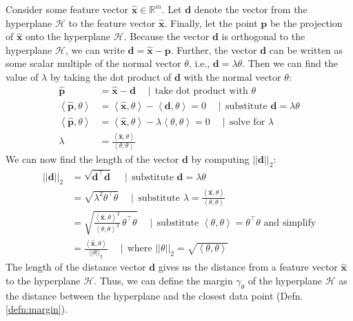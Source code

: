 \documentclass{article}[11pt]
\def\R{\mathbb{R}}
\newcommand{\norm}[1]{\left|\left|#1\right|\right|}
\begin{document}
Consider some feature vector $\hat{\mathbf{x}} \in \R^{m}$. Let $\mathbf{d}$ denote the vector from the hyperplane $\mathcal{H}$ to the feature vector $\hat{\mathbf{x}}$.
Finally, let the point $\mathbf{p}$ be the projection of $\hat{\mathbf{x}}$ onto the hyperplane $\mathcal{H}$.
Because the vector $\mathbf{d}$ is orthogonal to the hyperplane $\mathcal{H}$, we can write $\mathbf{d} = \hat{\mathbf{x}} - \mathbf{p}$.
Further, the vector $\mathbf{d}$ can be written as some scalar multiple of the normal vector $\theta$, i.e., $\mathbf{d} = \lambda \theta$.
Then we can find the value of $\lambda$ by taking the dot product of $\mathbf{d}$ with the normal vector $\theta$:
\begin{align*}
    \hat{\mathbf{p}} & = \hat{\mathbf{x}} - \mathbf{d}\quad\mid\,\text{take dot product with $\theta$} \\
    \left<\hat{\mathbf{p}},\theta\right> & = \left<\hat{\mathbf{x}},\theta\right> - \left<\mathbf{d},\theta\right> = 0\quad\mid\,\text{substitute $\mathbf{d} = \lambda \theta$} \\
    \left<\hat{\mathbf{p}},\theta\right> & = \left<\hat{\mathbf{x}},\theta\right> - \lambda \left<\theta,\theta\right> = 0\quad\mid\,\text{solve for $\lambda$} \\
    \lambda & = \frac{\left<\hat{\mathbf{x}},\theta\right>}{\left<\theta,\theta\right>}
\end{align*}
We can now find the length of the vector $\mathbf{d}$ by computing $\norm{\mathbf{d}}_{2}$:
\begin{align*}
    \norm{\mathbf{d}}_{2} & = \sqrt{\mathbf{d}^{\top}\mathbf{d}}\quad\mid\,\text{substitute $\mathbf{d} = \lambda \theta$} \\
    & = \sqrt{\lambda^{2}\theta^{\top}\theta}\quad\mid\,\text{substitute $\lambda = \frac{\left<\hat{\mathbf{x}},\theta\right>}{\left<\theta,\theta\right>}$} \\
    & = \sqrt{\frac{\left<\hat{\mathbf{x}},\theta\right>^{2}}{\left<\theta,\theta\right>^{2}}\,\theta^{\top}\theta}\quad\mid\, \text{substitute $\left<\theta,\theta\right> = \theta^{\top}\theta$ and simplify} \\
    & = \frac{\left<\hat{\mathbf{x}},\theta\right>}{\norm{\theta}_{2}}\quad\mid\,\text{where $\norm{\theta}_{2} = \sqrt{\left<\theta,\theta\right>}$}
\end{align*}
The length of the distance vector $\mathbf{d}$ gives us the distance from a feature vector $\hat{\mathbf{x}}$ to the hyperplane $\mathcal{H}$.
Thus, we can define the margin $\gamma_{\theta}$ of the hyperplane $\mathcal{H}$ as the distance between the hyperplane and the closest data point (Defn. \ref{defn:margin}).
\end{document}

